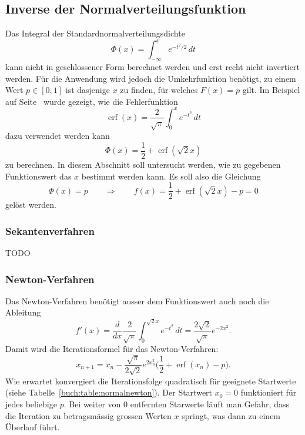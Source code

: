 %
%
%
\subsection{Inverse der Normalverteilungsfunktion
\label{buch:subsection:inversenormal}}
Das Integral der Standardnormalverteilungsdichte
\[
\Phi(x) = \int_{-\infty}^x e^{-t^2/2}\,dt
\]
kann nicht in geschlossener Form berechnet werden und erst recht
nicht invertiert werden.
Für die Anwendung wird jedoch die Umkehrfunktion benötigt, zu einem Wert
$p\in[0,1]$ ist dasjenige $x$ zu finden, für welches $F(x)=p$ gilt.
Im Beispiel auf Seite~\pageref{buch:beispiel:erfc} wurde gezeigt,
wie die Fehlerfunktion
\[
\operatorname{erf}(x) = \frac{2}{\sqrt{\pi}}\int_0^x e^{-t^2}\,dt
\]
dazu verwendet werden kann
\[
\Phi(x) = \frac12+\operatorname{erf}(\sqrt{2}x)
\]
zu berechnen.
In diesem Abschnitt soll untersucht werden, wie zu gegebenen Funktionswert
das $x$ bestimmt werden kann.
Es soll also die Gleichung
\[
\Phi(x)=p
\qquad\Rightarrow\qquad
f(x)=\frac12+\operatorname{erf}(\sqrt{2}x)-p=0
\]
gelöst werden.

\subsubsection{Sekantenverfahren}
TODO

\subsubsection{Newton-Verfahren}
Das Newton-Verfahren benötigt ausser dem Funktionswert auch noch die 
Ableitung
\[
f'(x)
=
\frac{d}{dx}\frac{2}{\sqrt{\pi}}\int_0^{\sqrt{2}x} e^{-t^2}\,dt
=
\frac{2\sqrt{2}}{\sqrt{\pi}}e^{-2x^2}.
\]
Damit wird die Iterationsformel für das Newton-Verfahren:
\begin{equation}
x_{n+1} = x_n - \frac{\sqrt{\pi}}{2\sqrt{2}}e^{2x_n^2}
\biggl(\frac12+\operatorname{erf}(x_n) -p \biggr).
\end{equation}
Wie erwartet konvergiert die Iterationsfolge quadratisch für geeignete
Startwerte (siehe Tabelle~\ref{buch:table:normalnewton}).
Der Startwert $x_0=0$ funktioniert für jedes beliebige $p$.
Bei weiter von $0$ entfernten Starwerte läuft man Gefahr, dass die Iteration
zu betragsmässig grossen Werten $x$ springt, was dann zu einem Überlauf führt.

